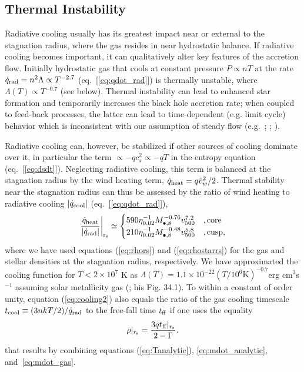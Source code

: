 \documentclass[usenatbib,fleqn]{mn2e}
\newcommand{\tff}{t_{\rm ff}}
\begin{document}
\subsection{Thermal Instability}
\label{sec:instability}

Radiative cooling usually has its greatest impact near or external to the stagnation radius, where the gas resides in near hydrostatic balance.  If radiative cooling becomes important, it can qualitatively alter key features of the accretion flow. Initially hydrostatic gas that cools at constant pressure $P \propto nT$ at the rate $\dot{q}_{\rm rad} = n^{2}\Lambda \propto T^{-2.7}$ (eq.~[\ref{eq:qdot_rad}]) is thermally unstable, where $\Lambda(T) \propto T^{-0.7}$ (see below).  Thermal instability can lead to enhanced star formation and temporarily increases the black hole accretion rate; when coupled to feed-back processes, the latter can lead to time-dependent (e.g. limit cycle) behavior which is inconsistent with our assumption of steady flow (e.g.~\citealt{Ciotti&Ostriker07}; \citealt{Ciotti+10}; \citealt{Gan+14}).  

Radiative cooling can, however, be stabilized if other sources of cooling dominate over it, in particular the term $\propto -q c_{s}^{2} \propto -qT$ in the entropy equation (eq.~[\ref{eq:dsdt}]).  Neglecting radiative cooling, this term is balanced at the stagnation radius by the wind heating term, $\dot{q}_{\rm heat} = q \tilde{v}_{w}^{2}/2$.  Thermal stability near the stagnation radius can thus be assessed by the ratio of wind heating to radiative cooling $|\dot{q}_{\rm cool}|$ (eq.~[\ref{eq:qdot_rad}]),
\begin{align}
\left.\frac{\dot{q}_{\rm heat}}{|\dot{q}_{\rm rad}|}\right|_{\rm r_{\rm s}} \simeq
  \begin{cases}
   590 \eta_{0.02}^{-1} M_{\bullet,8}^{-0.76}v_{500}^{7.2}  &, \text{core}\\
   210 \eta_{0.02}^{-1} M_{\bullet,8}^{-0.48}v_{500}^{5.8}  &, \text{cusp},     
  \end{cases}
  \label{eq:cooling2}
\end{align}
where we have used equations (\ref{eq:rhors}) and (\ref{eq:rhostarrs}) for the gas and stellar densities at the stagnation radius, respectively.  We have approximated the cooling function for $T < 2\times 10^{7}$ K as $\Lambda(T) = 1.1 \times 10^{-22} \left(T/10^6 \text{K}\right)^{-0.7}  $erg cm$^3 $s$^{-1}$ assuming solar metallicity gas (\citealt{Draine:2011a}; his Fig. 34.1).  To within a constant of order unity, equation (\ref{eq:cooling2}) also equals the ratio of the gas cooling timescale $t_{\rm cool} \equiv (3n kT/2)/\dot{q}_{\rm rad}$ to the free-fall time $t_{\rm ff}$ if one uses the equality 
\begin{align}
\rho|_{r_{\rm s}}=\frac{3 q\tff|_{r_{\rm s}}}{2-\Gamma}.
\label{eq:rhors2}
\end{align}
that results by combining equations (\ref{eq:Tanalytic}), \eqref{eq:mdot_analytic}, and~\eqref{eq:mdot_gas}.
\end{document}
